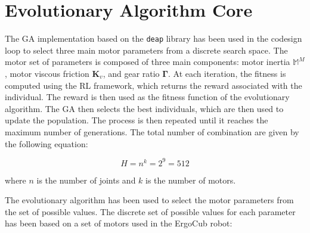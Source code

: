 \section{Evolutionary Algorithm Core}
\label{sec:EvolutionAlgo}

The \ac{GA} implementation based on the \texttt{deap} library \citep{DEAP_JMLR2012} has been used in the codesign loop to select three main motor parameters from a discrete search space.
The motor set of parameters is composed of three main components: motor inertia $\mathbb{M}^M$, motor viscous friction $\mathbf{K}_v$, and gear ratio $\boldsymbol{\Gamma}$. At each iteration, the fitness is computed using the \ac{RL} framework, which returns the reward associated with the individual. The reward is then used as the fitness function of the evolutionary algorithm. The \ac{GA} then selects the best individuals, which are then used to update the population. The process is then repeated until it reaches the maximum number of generations. The total number of combination are given by the following equation:

\begin{equation}
    H = n^k = 2^9 = 512
\end{equation}

where $n$ is the number of joints and $k$ is the number of motors.

The evolutionary algorithm has been used to select the motor parameters from the set of possible values. The discrete set of possible values for each parameter has been based on a set of motors used in the ErgoCub robot:

